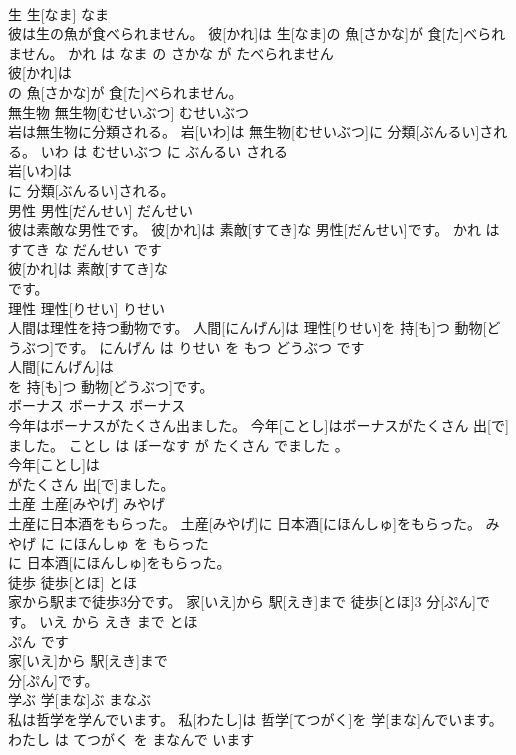\documentclass[8pt]{extreport}
\begin{document}
\begin{CJK}{UTF8}{min}
\\	生	生[なま]	なま	
\\	彼は生の魚が食べられません。	彼[かれ]は 生[なま]の 魚[さかな]が 食[た]べられません。	かれ は なま の さかな が たべられません	
\\	彼[かれ]は
\\	の 魚[さかな]が 食[た]べられません。			
\\	無生物	無生物[むせいぶつ]	むせいぶつ	
\\	岩は無生物に分類される。	岩[いわ]は 無生物[むせいぶつ]に 分類[ぶんるい]される。	いわ は むせいぶつ に ぶんるい される	
\\	岩[いわ]は
\\	に 分類[ぶんるい]される。			
\\	男性	男性[だんせい]	だんせい	
\\	彼は素敵な男性です。	彼[かれ]は 素敵[すてき]な 男性[だんせい]です。	かれ は すてき な だんせい です	
\\	彼[かれ]は 素敵[すてき]な
\\	です。			
\\	理性	理性[りせい]	りせい	
\\	人間は理性を持つ動物です。	人間[にんげん]は 理性[りせい]を 持[も]つ 動物[どうぶつ]です。	にんげん は りせい を もつ どうぶつ です	
\\	人間[にんげん]は
\\	を 持[も]つ 動物[どうぶつ]です。			
\\	ボーナス	ボーナス	ボーナス	
\\	今年はボーナスがたくさん出ました。	今年[ことし]はボーナスがたくさん 出[で]ました。	ことし は ぼーなす が たくさん でました 。	
\\	今年[ことし]は
\\	がたくさん 出[で]ました。			
\\	土産	土産[みやげ]	みやげ	
\\	土産に日本酒をもらった。	土産[みやげ]に 日本酒[にほんしゅ]をもらった。	みやげ に にほんしゅ を もらった	
\\	に 日本酒[にほんしゅ]をもらった。			
\\	徒歩	徒歩[とほ]	とほ	
\\	家から駅まで徒歩3分です。	家[いえ]から 駅[えき]まで 徒歩[とほ]3 分[ぷん]です。	いえ から えき まで とほ 
\\	ぷん です	
\\	家[いえ]から 駅[えき]まで
\\	分[ぷん]です。			
\\	学ぶ	学[まな]ぶ	まなぶ	
\\	私は哲学を学んでいます。	私[わたし]は 哲学[てつがく]を 学[まな]んでいます。	わたし は てつがく を まなんで います	

\end{CJK}
\end{document}
